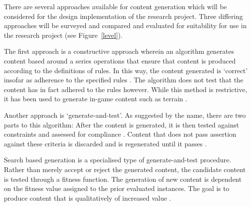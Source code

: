\documentclass[11pt, a4paper, oneside]{report} %
\begin{document}
There are several approaches available for content generation which will be considered for the
design implementation of the research project. Three differing approaches will be surveyed and
compared and evaluated for suitability for use in the research project (see Figure~\ref{level}).

The first approach is a constructive approach wherein an algorithm generates content based around a
series operations that ensure that content is produced according to the definitions of rules. In
this way, the content generated is `correct' insofar as adherence to the specified rules
\cite{browne2008automatic}. The algorithm does not test that the content has in fact adhered to the
rules however. While this method is restrictive, it has been used to generate in-game content such
as terrain \cite{Miller:1986:DRT:15886.15890}.

Another approach is `generate-and-test'. As suggested by the name, there are two parts to this
algorithm: After the content is generated, it is then tested against constraints and assessed for
compliance \cite{5756645}. Content that does not pass assertion against these criteria is discarded and is
regenerated until it passes \cite{5756645}.

Search based generation is a specialised type of generate-and-test procedure. Rather than merely
accept or reject the generated content, the candidate content is tested through a fitness function.
The generation of new content is dependent on the fitness value assigned to the prior evaluated
instances. The goal is to produce content that is qualitatively of increased value \cite{5756645}.



\end{document}
